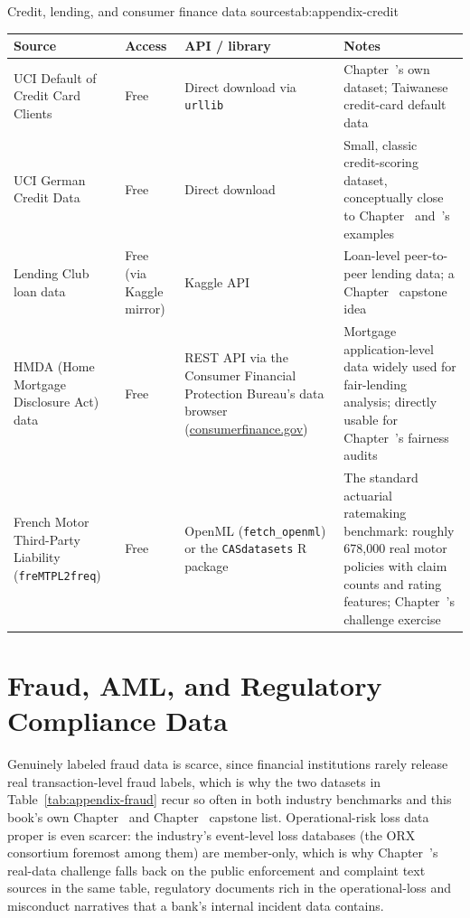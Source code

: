 \documentclass[../ai_in_finance]{subfiles}
\begin{document}
\begin{booktable}[htbp]{Credit, lending, and consumer finance data sources}{tab:appendix-credit}
\begin{tabular}{L{3.4cm}L{2.2cm}L{3.6cm}L{3.4cm}}
\toprule
Source & Access & API / library & Notes \\
\midrule
UCI Default of Credit Card Clients & Free & Direct download via \texttt{urllib} & Chapter~'s own dataset; Taiwanese credit-card default data \\
UCI German Credit Data & Free & Direct download & Small, classic credit-scoring dataset, conceptually close to Chapter~ and~'s examples \\
Lending Club loan data & Free (via Kaggle mirror) & Kaggle API & Loan-level peer-to-peer lending data; a Chapter~ capstone idea \\
HMDA (Home Mortgage Disclosure Act) data & Free & REST API via the Consumer Financial Protection Bureau's data browser (\url{consumerfinance.gov}) & Mortgage application-level data widely used for fair-lending analysis; directly usable for Chapter~'s fairness audits \\
French Motor Third-Party Liability (\texttt{freMTPL2freq}) & Free & OpenML (\texttt{fetch\_openml}) or the \texttt{CASdatasets} R package & The standard actuarial ratemaking benchmark: roughly 678{,}000 real motor policies with claim counts and rating features; Chapter~'s challenge exercise \\
\bottomrule
\end{tabular}
\end{booktable}

\section{Fraud, AML, and Regulatory Compliance Data}

Genuinely labeled fraud data is scarce, since financial institutions rarely release real transaction-level fraud labels, which is why the two datasets in Table~\ref{tab:appendix-fraud} recur so often in both industry benchmarks and this book's own Chapter~ and Chapter~ capstone list. Operational-risk loss data proper is even scarcer: the industry's event-level loss databases (the ORX consortium foremost among them) are member-only, which is why Chapter~'s real-data challenge falls back on the public enforcement and complaint text sources in the same table, regulatory documents rich in the operational-loss and misconduct narratives that a bank's internal incident data contains.
\end{document}
